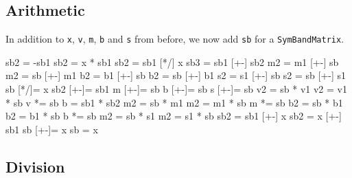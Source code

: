\documentclass[twoside,letterpaper,11pt]{article}
\renewcommand{\tt}[1]{{\lstinline {#1}}}
\begin{document}
\subsection{Arithmetic}
\label{SymBandMatrix_Arithmetic}

In addition to \tt{x}, \tt{v}, \tt{m}, \tt{b} and \tt{s} from before, 
we now add \tt{sb} for a \tt{SymBandMatrix}.

\begin{tmvcode}
sb2 = -sb1
sb2 = x * sb1
sb2 = sb1 [*/] x
sb3 = sb1 [+-] sb2
m2 = m1 [+-] sb
m2 = sb [+-] m1
b2 = b1 [+-] sb
b2 = sb [+-] b1
s2 = s1 [+-] sb
s2 = sb [+-] s1
sb [*/]= x
sb2 [+-]= sb1
m [+-]= sb
b [+-]= sb
s [+-]= sb
v2 = sb * v1
v2 = v1 * sb
v *= sb
b = sb1 * sb2
m2 = sb * m1
m2 = m1 * sb
m *= sb
b2 = sb * b1
b2 = b1 * sb
b *= sb
m2 = sb * s1
m2 = s1 * sb
sb2 = sb1 [+-] x
sb2 = x [+-] sb1
sb [+-]= x
sb = x
\end{tmvcode}

\subsection{Division}
\label{SymBandMatrix_Division}
\end{document}
